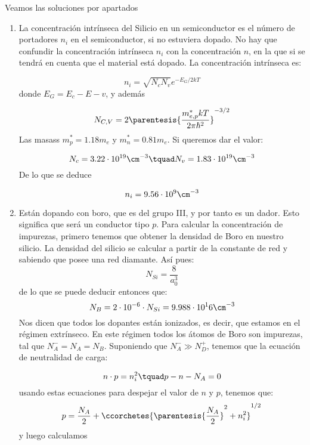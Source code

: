 	Veamos las soluciones por apartados
	\begin{enumerate}[label=\alph*)]
		\item La concentración intrínseca del Silicio en un semiconductor es el número de portadores $n_i$ en el semiconductor, si no estuviera dopado. No hay que confundir la concentración intrínseca $n_i$ con la concentración $n$, en la que si se tendrá en cuenta que el material está dopado. La concentración intrínseca es:
		
		\begin{equation}
			n_i = \sqrt{N_cN_v} e^{-E_G/2kT}
		\end{equation}
		donde $E_G=E_c-E-v$, y además

		\begin{equation}
			N_{C,V} = 2 \parentesis{\frac{m_{e,p}^* kT}{2\pi\hbar^2}}^{-3/2}
		\end{equation}
		Las masass $m_p^*= 1.18m_e$ y $m_n^*=0.81m_e$. Si queremos dar el valor:

		\begin{equation}
			N_c = 3.22 \cdot 10^{19} \cm^{-3} \tquad 	N_v = 1.83 \cdot 10^{19} \cm^{-3}
		\end{equation}
		De lo que se deduce

		\begin{equation}
			n_i = 9.56 \cdot 10^9 \cm^{-3}
		\end{equation}


		\item Están dopando con boro, que es del grupo III, y por tanto es un dador. Esto significa que será un conductor tipo $p$. Para calcular la concentración de impurezas, primero tenemos que obtener la densidad de Boro en nuestro silicio. La densidad del silicio se calcular a partir de la constante de red y sabiendo que posee una red diamante. Así pues:
		\begin{equation}
			N_{Si} = \frac{8}{a_0^3}
		\end{equation}
		de lo que se puede deducir entonces que:
		\begin{equation}
			N_B = 2\cdot 10^{-6} \cdot N_{Si} = 9.988 \cdot 10^16 \cm^{-3}
		\end{equation}
		Nos dicen que todos los dopantes están ionizados, es decir, que estamos en el régimen extrínseco. En este régimen todos los átomos de Boro son impurezas, tal que $N_A^-=N_A=N_B$. Suponiendo que $N_A^- \gg N_D^+$, tenemos que la ecuación de neutralidad de carga:

		\begin{equation}
			n\cdot p = n_i^2 \tquad p-n-N_A = 0
		\end{equation}
		usando estas ecuaciones para despejar el valor de $n$ y $p$, tenemos que:	
		\begin{equation}
			p = \frac{N_A}{2} + \ccorchetes{\parentesis{\frac{N_A}{2}}^2 + n_i^2}^{1/2}
		\end{equation}
		y luego calculamos


\end{enumerate}
